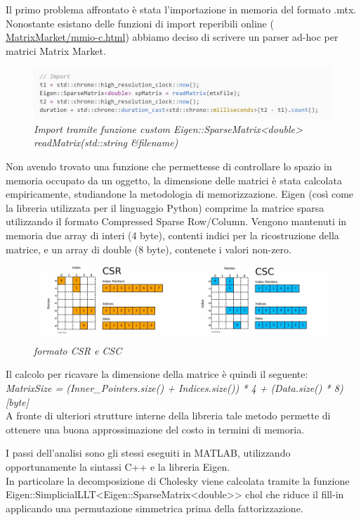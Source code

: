\documentclass[a4paper,10pt]{article}
\begin{document}
Il primo problema affrontato è stata l’importazione in memoria del formato .mtx. Nonostante esistano delle funzioni di import reperibili online ( \href{https://math.nist.gov/MatrixMarket/mmio-c.html}{MatrixMarket/mmio-c.html}) abbiamo deciso di scrivere un parser ad-hoc per matrici Matrix Market.

\begin{figure}[H]
\centering
\includegraphics[width=0.7\linewidth]{img/c++1.jpg}
\caption{\textit{Import tramite funzione custom Eigen::SparseMatrix<double> readMatrix(std::string \&filename)}}
\end{figure}

Non avendo trovato una funzione che permettesse di controllare lo spazio in memoria occupato da un oggetto, la dimensione delle matrici è stata calcolata empiricamente, studiandone la metodologia di memorizzazione. 
Eigen (così come la libreria utilizzata per il linguaggio Python) comprime la matrice sparsa utilizzando il formato Compressed Sparse Row/Column. Vengono mantenuti in memoria due array di interi (4 byte), contenti indici per la ricostruzione della matrice, e un array di double (8 byte), contenete i valori non-zero.

\begin{figure}[H]
\centering
\includegraphics[width=0.7\linewidth]{img/c++2.jpg}
\caption{\textit{formato CSR e CSC}}
\end{figure}

Il calcolo per ricavare la dimensione della matrice è quindi il seguente: \\
\textit{MatrixSize = (Inner\_Pointers.size() + Indices.size()) * 4 + (Data.size() * 8) [byte]} \\

A fronte di ulteriori strutture interne della libreria tale metodo permette di ottenere una buona approssimazione del costo in termini di memoria.

I passi dell’analisi sono gli stessi eseguiti in MATLAB, utilizzando opportunamente la sintassi C++ e la libreria Eigen.\\
In particolare la decomposizione di Cholesky viene calcolata tramite la funzione Eigen::SimplicialLLT<Eigen::SparseMatrix<double>> chol che riduce il fill-in applicando una permutazione simmetrica prima della fattorizzazione. %
\end{document}
